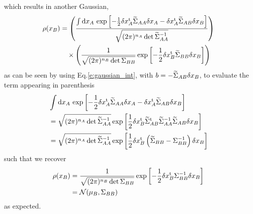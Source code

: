 \documentclass[nobib]{tufte-handout}
\begin{document}
which results in another Gaussian,
\begin{align*}
  \rho(x_B) &= \left(\frac{\int\text{d} x_A\, \exp{\left[-\frac{1}{2}\delta x_A^\textrm{t}\widetilde{\Sigma}_{AA}\delta x_A - \delta x_A^\textrm{t} \widetilde{\Sigma}_{AB}\delta x_B\right]}}{\sqrt{(2\pi)^{n_A}\det{\widetilde{\Sigma}_{AA}^{-1}}}}\right)\\
  &\quad \times \left(\frac{1}{\sqrt{(2\pi)^{n_B} \det\Sigma_{BB}}} \exp\left[-\frac{1}{2}\delta x^\textrm{t}_B \widetilde{\Sigma}_{BB} \delta x_B \right]\right)
  \notag
\end{align*}
as can be seen by using Eq.\eqref{e:gaussian_int}, with $b = -\widetilde{\Sigma}_{AB}\delta x_B$, to evaluate the term appearing in parenthesis
\begin{align*}
  &\int\text{d} x_A\,\exp{\left[-\frac{1}{2}\delta x_A^\textrm{t} \widetilde{\Sigma}_{AA}\delta x_A - 
  \delta x_A^\textrm{t} \widetilde{\Sigma}_{AB}\delta x_B\right]}\\
  &= \sqrt{(2\pi)^{n_A} \det{\widetilde{\Sigma}_{AA}^{-1}}} \exp{\left[\frac{1}{2} \delta x_B^\textrm{t} \widetilde{\Sigma}_{AB}^\textrm{t} \widetilde{\Sigma}_{AA}^{-1} \widetilde{\Sigma}_{AB}\delta x_B\right]}\\
  &= \sqrt{(2\pi)^{n_A} \det{\widetilde{\Sigma}_{AA}^{-1}}} \exp{\left[\frac{1}{2}\delta x_B^\textrm{t}\left(\widetilde{\Sigma}_{BB} - \Sigma^{-1}_{BB}\right)\delta x_B\right]}
\end{align*}
such that we recover 
\begin{align}
  \rho(x_B) &= \frac{1}{\sqrt{(2\pi)^{n_B} \det{\Sigma_{BB}}}} 
  \exp{\left[-\frac{1}{2}\delta x_B^\textrm{t}\Sigma_{BB}^{-1}\delta x_B\right]}\label{e:gaussian_marg} \\
  &= \mathcal{N}(\mu_B, \Sigma_{BB})
\end{align}
as expected.
\end{document}
